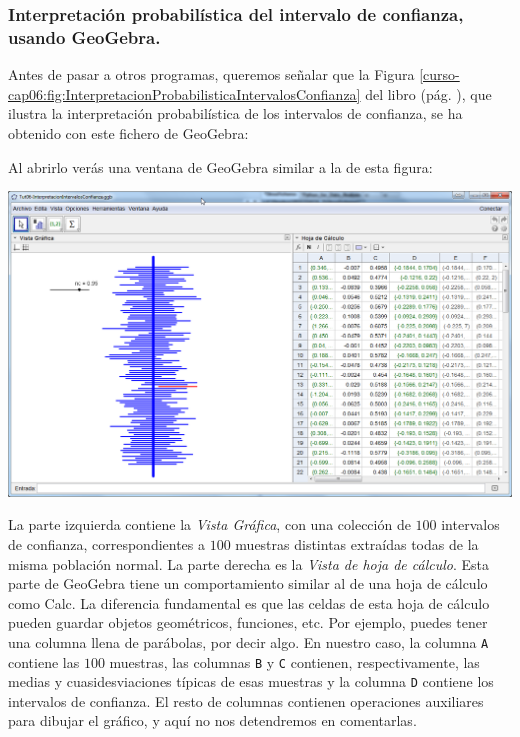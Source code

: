\documentclass[10pt,a4paper]{article}\usepackage[]{graphicx}\usepackage[]{color}
\newcounter {cont01}
\begin{document}
\subsubsection*{Interpretación probabilística del intervalo de confianza, usando GeoGebra.}
\label{tut06:subsubsec:InterpretacionProbabilisticaIntConfGeoGebra}

Antes de pasar a otros programas, queremos señalar que la Figura \ref{curso-cap06:fig:InterpretacionProbabilisticaIntervalosConfianza} del libro (pág. \pageref{curso-cap06:fig:InterpretacionProbabilisticaIntervalosConfianza}), que ilustra la interpretación probabilística de los intervalos de confianza, se ha obtenido con este fichero de GeoGebra:
\begin{center}
\end{center}
Al abrirlo verás una ventana de GeoGebra similar a la de esta figura:
    \begin{center}
        \includegraphics[width=15.5 cm]{../fig/Tut06-19.png}
    \end{center}
La parte izquierda contiene la {\em Vista Gráfica}, con una colección de $100$ intervalos de confianza, correspondientes a $100$ muestras distintas extraídas todas de la misma población normal. La parte derecha es la {\em Vista de hoja de cálculo}. Esta parte de GeoGebra tiene un comportamiento similar al de una hoja de cálculo como Calc. La diferencia fundamental es que las celdas de esta hoja de cálculo pueden guardar objetos geométricos, funciones, etc. Por ejemplo, puedes tener una columna llena de parábolas, por decir algo. En nuestro caso, la columna {\tt A} contiene las $100$ muestras, las columnas {\tt B} y {\tt C} contienen, respectivamente, las medias y cuasidesviaciones típicas de esas muestras y la columna {\tt D} contiene los intervalos de confianza. El resto de columnas contienen operaciones auxiliares para dibujar el gráfico, y aquí no nos detendremos en comentarlas.
\end{document}
